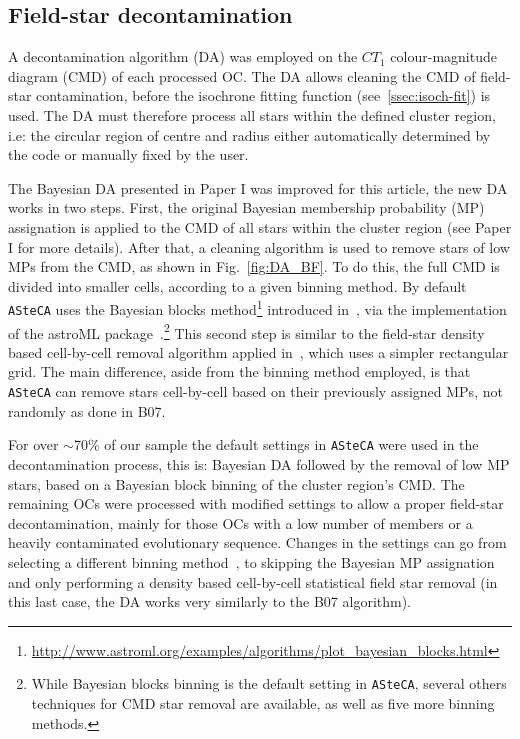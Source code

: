 \documentclass[a4paper,fleqn,usenatbib]{mnras}
\begin{document}

\subsection{Field-star decontamination}
\label{ssec:dencontamination}

A decontamination algorithm (DA) was employed on the $CT_1$
colour-magnitude diagram (CMD) of each processed OC.\@
The DA allows cleaning the CMD of field-star contamination, before the isochrone
fitting function (see~\ref{ssec:isoch-fit}) is used. The DA must therefore
process all stars within the defined cluster region, i.e: the circular region of
centre and radius either automatically determined by the code or manually fixed
by the user.

The Bayesian DA presented in Paper I was improved for this article, the new DA
works in two steps. First, the original Bayesian membership probability (MP)
assignation is applied to the CMD of all stars within the cluster region (see
Paper I for more details).\@
%
After that, a cleaning algorithm is used to remove stars of low MPs from the
CMD, as shown in Fig.~\ref{fig:DA_BF}.
To do this, the full CMD is divided into smaller cells, according to a
given binning method. By default \texttt{ASteCA} uses the Bayesian blocks
method\footnote{\url{http://www.astroml.org/examples/algorithms/plot_bayesian_blocks.html}}
introduced in~\cite{Scargle_2013}, via the implementation of the astroML
package~\citep{Vanderplas_2012}.\footnote{While Bayesian blocks binning is the
default setting in \texttt{ASteCA}, several others techniques for CMD star
removal are available, as well as five more binning methods.}
This second step is similar to the field-star density based cell-by-cell removal
algorithm applied in~\citet[][B07]{Bonatto_2007}, which uses a simpler
rectangular grid.
%
The main difference, aside from the binning method employed, is that
\texttt{ASteCA} can remove stars cell-by-cell based on their previously assigned
MPs, not randomly as done in B07.

For over $\sim$70\% of our sample the default settings in \texttt{ASteCA} were
used in the decontamination process, this is: Bayesian DA followed by the
removal of low MP stars, based on a Bayesian block binning of the cluster
region's CMD.\@
%
The remaining OCs were processed with modified settings to allow a proper
field-star decontamination, mainly for those OCs with a low number of members or
a heavily contaminated evolutionary sequence.
Changes in the settings can go from selecting a different binning
method~\citep[often a rectangular grid using Scott's rule,][]{Scott_1979}, to
skipping the Bayesian MP assignation and only performing a density based
cell-by-cell statistical field star removal (in this last case, the DA works
very similarly to the B07 algorithm).
\end{document}
